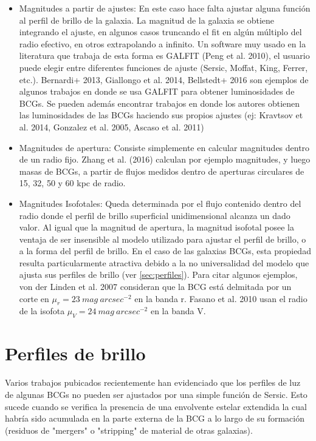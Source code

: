 \begin{itemize}
\item Magnitudes a partir de ajustes: En este caso hace falta ajustar alguna funci\'on al perfil de brillo de la galaxia. La magnitud de la galaxia se obtiene integrando el ajuste, en algunos casos truncando el fit en algún múltiplo del radio efectivo, en otros extrapolando a infinito. Un software muy usado en la literatura que trabaja de esta forma es GALFIT (Peng et al. 2010), el usuario puede elegir entre diferentes funciones de ajuste (Sersic, Moffat, King, Ferrer, etc.).  Bernardi+ 2013, Giallongo et al. 2014, Bellstedt+ 2016 son ejemplos de algunos trabajos en donde se usa GALFIT para obtener luminosidades de BCGs. Se pueden adem\'as encontrar trabajos en donde los autores obtienen las luminosidades de las BCGs haciendo sus propios ajustes (ej: Kravtsov et al. 2014, Gonzalez et al. 2005, Ascaso et al. 2011)

\item Magnitudes de apertura: Consiste simplemente en calcular magnitudes dentro de un radio fijo. Zhang et al. (2016) calculan por ejemplo magnitudes, y luego masas de BCGs, a partir de flujos medidos dentro de aperturas circulares de 15, 32, 50 y 60 kpc de radio.

\item Magnitudes Isofotales: Queda determinada por el flujo contenido dentro del radio donde el perfil de brillo superficial unidimensional alcanza un dado valor. Al igual que la magnitud de apertura, la magnitud isofotal posee la ventaja de ser insensible al modelo utilizado para ajustar el perfil de brillo, o a la forma del perfil de brillo. En el caso de las galaxias BCGs, esta propiedad resulta particularmente atractiva debido a la no universalidad del modelo que ajusta sus perfiles de brillo (ver \autoref{sec:perfiles}). 
Para citar algunos ejemplos, von der Linden et al. 2007 consideran que la BCG est\'a delmitada por un corte en $\mu_r=23~mag~arcsec^{-2}$ en la banda r. Fasano et al. 2010 usan el radio de la isofota $\mu_V=24~mag~arcsec^{-2}$ en la banda V. 




\end{itemize}
\section{Perfiles de brillo}
\label{sec:perfiles}
Varios trabajos pubicados recientemente han evidenciado que los perfiles de luz de algunas BCGs no pueden ser ajustados por una simple funci\'on de Sersic. 
Esto sucede cuando se verifica la presencia de una envolvente estelar extendida la cual habr\'ia sido acumulada en la parte externa de la BCG a lo largo de su formaci\'on (residuos de "mergers" o "stripping" de material de otras galaxias).

